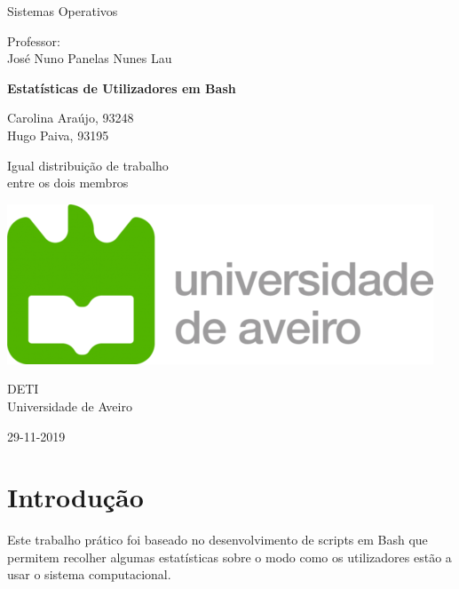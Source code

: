 \documentclass[10pt,portuguese]{article}
\begin{document}

\begin{titlepage}
	\clearpage\thispagestyle{empty}
	\centering
	\vspace{2cm}

	
	{\Large  Sistemas Operativos \par}
	\vspace{0.5cm}
	{\small Professor: \\
	José Nuno Panelas Nunes Lau\par}
	\vspace{4cm}
	{\Huge \textbf{Estatísticas de Utilizadores em Bash}} \\
	\vspace{1cm}
	\vspace{4cm}
	{\normalsize Carolina Araújo, 93248 \\ 
	             Hugo Paiva, 93195
	   \par}
	   	{\tiny
	Igual distribuição de trabalho \\entre os dois membros\par}
	\vspace{2cm}

    \includegraphics[scale=0.20]{images/logo_ua.png}
    
    \vspace{2cm}
    
	{\normalsize DETI \\ 
		Universidade de Aveiro \par}
		
	{\normalsize 29-11-2019 \par}
	\vspace{2cm}
		
	
	\pagebreak

\end{titlepage}
\tableofcontents{}
\clearpage

\section{Introdução}
\par Este trabalho prático foi baseado no desenvolvimento de scripts em Bash que permitem recolher algumas estatísticas sobre o modo como os utilizadores estão a usar o sistema computacional. 
\end{document}
